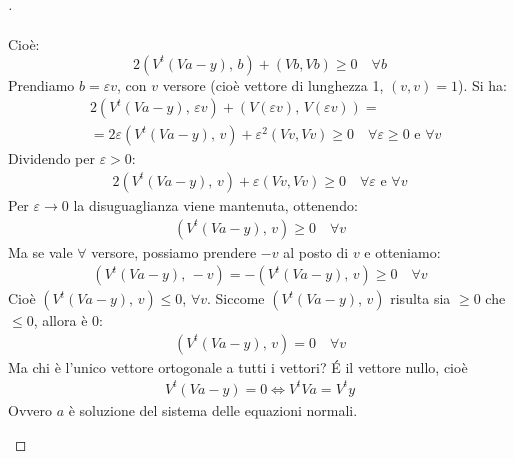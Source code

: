 \documentclass[12pt,a4paper]{article}
\begin{document}
\begin{proof}[\unskip\nopunct]
\begin{itemize}
\[\begin{split}
\end{split} \]
Cioè:
\[
	2(V^t(Va-y), \, b) + (Vb,Vb) \geq 0 \quad \forall b
\]
Prendiamo $b=\varepsilon v$, con $v$ versore (cioè vettore di lunghezza 1, $(v,v)=1$). Si ha:
\[ \begin{split}
	& 2(V^t(Va-y), \, \varepsilon v)+(V(\varepsilon v), \, V(\varepsilon v)) = \\
	& = 2\varepsilon (V^t(Va-y), \, v) + \varepsilon^2(Vv,Vv) \geq 0 \quad \forall \varepsilon \geq 0 \text{ e } \forall v
\end{split} \]
Dividendo per $\varepsilon > 0$:
\[ \begin{split}
	2(V^t(Va-y), \, v) + \varepsilon(Vv,Vv) \geq 0 \quad \forall \varepsilon \text{ e } \forall v
\end{split} \]
Per $\varepsilon \to 0$ la disuguaglianza viene mantenuta, ottenendo:
\[ \begin{split}
	(V^t(Va-y), \, v) \geq 0 \quad \forall v
\end{split} \]
Ma se vale $\forall$ versore, possiamo prendere $-v$ al posto di $v$ e otteniamo:
\[ \begin{split}
	(V^t(Va-y), \, -v)=-(V^t(Va-y), \, v) \geq 0 \quad \forall v
\end{split} \]
Cioè $(V^t(Va-y), \, v) \leq 0$, $\forall v$. Siccome $(V^t(Va-y), \, v)$ risulta sia $\geq 0$ che $\leq 0$, allora è $0$:
\[ \begin{split}
	(V^t(Va-y), \, v)=0 \quad \forall v
\end{split} \]
Ma chi è l'unico vettore ortogonale a tutti i vettori? \'E il vettore nullo, cioè
\[ \begin{split}
	V^t(Va-y)=0 \iff V^tVa=V^ty
\end{split} \]
Ovvero $a$ è soluzione del sistema delle equazioni normali.
\end{itemize}
\end{proof}
\end{document}
